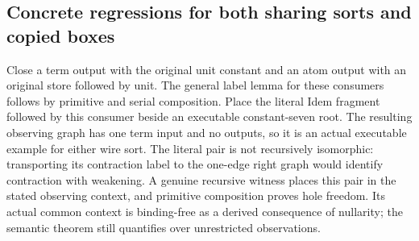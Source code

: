 \subsection{Concrete regressions for both sharing sorts and copied boxes}
Close a term output with the original unit constant and an atom output with
an original store followed by unit. The general label lemma for these
consumers follows by primitive and serial composition. Place the literal
Idem fragment followed by this consumer beside an executable constant-seven
root. The resulting observing graph has one term input and no outputs,
so it is an actual executable example for either wire sort.
The literal pair is not recursively isomorphic: transporting its contraction
label to the one-edge right graph would identify contraction with weakening.
A genuine recursive witness places this pair in the stated observing context,
and primitive composition proves hole freedom. Its actual common context is
binding-free as a derived consequence of nullarity; the semantic theorem
still quantifies over unrestricted observations.
\par{}

